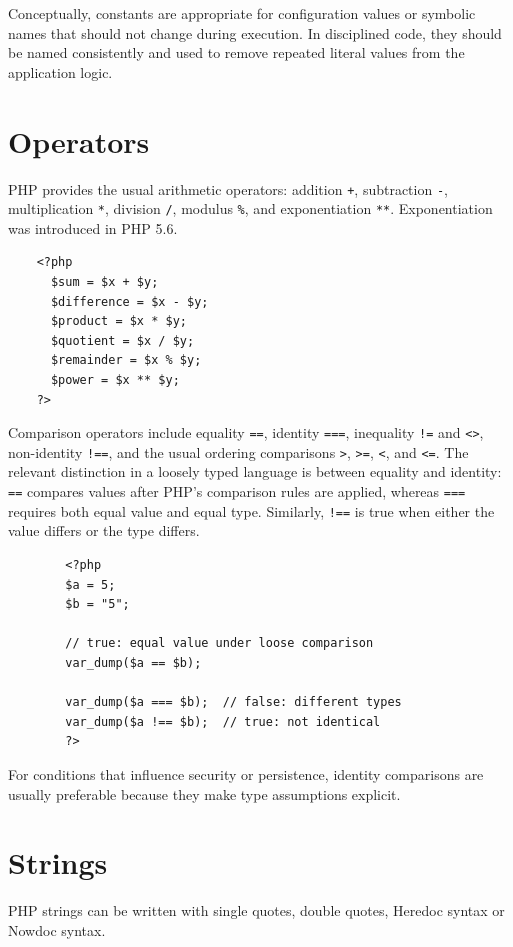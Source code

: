 \documentclass{scrbook}
\begin{document}
	Conceptually, constants are appropriate for configuration values or symbolic names that should not change during execution. In disciplined code, they should be named consistently and used to remove repeated literal values from the application logic.
	
	\section{Operators}
	
	PHP provides the usual arithmetic operators: addition \texttt{+}, subtraction \texttt{-}, multiplication \texttt{*}, division \texttt{/}, modulus \texttt{\%}, and exponentiation \texttt{**}. Exponentiation was introduced in PHP 5.6.
	
	\begin{lstlisting}
	<?php
	  $sum = $x + $y;
	  $difference = $x - $y;
	  $product = $x * $y;
	  $quotient = $x / $y;
	  $remainder = $x % $y;
	  $power = $x ** $y;
	?>
	\end{lstlisting}
	
	Comparison operators include equality \texttt{==}, identity \texttt{===}, inequality \texttt{!=} and \texttt{<>}, non-identity \texttt{!==}, and the usual ordering comparisons \texttt{>}, \texttt{>=}, \texttt{<}, and \texttt{<=}. The relevant distinction in a loosely typed language is between equality and identity: \texttt{==} compares values after PHP's comparison rules are applied, whereas \texttt{===} requires both equal value and equal type. Similarly, \texttt{!==} is true when either the value differs or the type differs.
	
	\begin{lstlisting}
		<?php
		$a = 5;
		$b = "5";
		
		// true: equal value under loose comparison
		var_dump($a == $b);
		
		var_dump($a === $b);  // false: different types
		var_dump($a !== $b);  // true: not identical
		?>
	\end{lstlisting}
	
	For conditions that influence security or persistence, identity comparisons are usually preferable because they make type assumptions explicit.
	
	\section{Strings}
	
	PHP strings can be written with single quotes, double quotes, Heredoc syntax or Nowdoc syntax.
	
\end{document}
